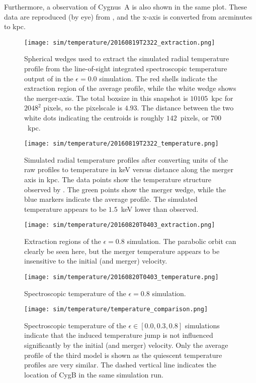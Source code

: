\documentclass[MScProj_TLRH_ClusterEnergy.tex]{subfiles}
\begin{document}
Furthermore, a  observation of Cygnus~A is also shown in the
same plot. These data are reproduced (by eye) from \citet{2013AN....334..346S},
and the x-axis is converted from arcminutes to kpc.

\clearpage
\begin{figure}
    \centering
    \texttt{[image: sim/temperature/20160819T2322\_extraction.png]}
    \caption{Spherical wedges used to extract the simulated radial temperature 
             profile from the line-of-sight integrated spectroscopic temperature 
             output of  in the $\epsilon = 0.0$ simulation. The red 
             shells indicate the extraction region 
             of the average profile, while the white wedge shows the merger-axis.
             The total boxsize in this snapshot is $10105$~kpc for $2048^2$ pixels,
             so the pixelscale is $4.93$. The distance between the two white dots
             indicating the centroids is roughly $142$~pixels, or $700$~kpc.}
    \label{fig:20160819T2322_E}
    \texttt{[image: sim/temperature/20160819T2322\_temperature.png]}
    \caption{Simulated radial temperature profiles after converting units of the raw 
             profiles to temperature in keV versus distance along the merger axis in
             kpc. The data points show the temperature structure observed by 
             . The green points show the merger wedge, while the 
             blue markers indicate the average profile. The simulated temperature 
             appears to be $1.5$~keV lower than observed.}
    \label{fig:20160819T2322_T}
\end{figure}
\clearpage
\begin{figure}
    \centering
    \texttt{[image: sim/temperature/20160820T0403\_extraction.png]}
    \caption{Extraction regions of the $\epsilon = 0.8$ simulation. The 
             parabolic orbit can clearly be seen here, but the merger temperature
             appears to be insensitive to the initial (and merger) velocity.}
    \label{fig:20160820T0403_E}
    \texttt{[image: sim/temperature/20160820T0403\_temperature.png]}
    \caption{Spectroscopic temperature of the $\epsilon = 0.8$ simulation.}
    \label{fig:20160820T0403_T}
\end{figure}
\clearpage

\begin{figure}
    \centering
    \texttt{[image: sim/temperature/temperature\_comparison.png]}
    \caption{Spectroscopic temperature of the $\epsilon \in [0.0, 0.3, 0.8]$ 
             simulations indicate that the induced temperature jump is not
             influenced significantly by the initial (and merger) velocity. Only
             the average profile of the third model is shown as the quiescent 
             temperature profiles are very similar. The dashed vertical line
             indicates the location of CygB in the same simulation run.}
    \label{fig:tjump_vs_velocity}
\end{figure}
\end{document}

